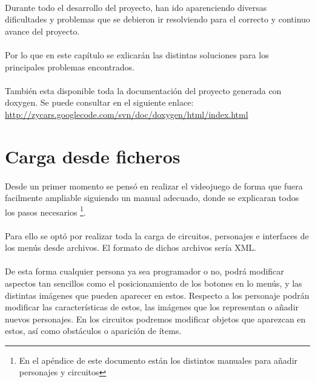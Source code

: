 \paragraph{}
Durante todo el desarrollo del proyecto, han ido aparenciendo diversas dificultades y problemas que se debieron ir
resolviendo para el correcto y continuo avance del proyecto.

\paragraph{}
Por lo que en este capítulo se exlicarán las distintas soluciones para los principales problemas encontrados. 

\paragraph{}
También esta disponible toda la documentación del proyecto generada con doxygen. Se puede consultar en el siguiente enlace:\\

\url{http://zycars.googlecode.com/svn/doc/doxygen/html/index.html}


\section{Carga desde ficheros}

\paragraph{}
Desde un primer momento se pensó en realizar el videojuego de forma que fuera facilmente ampliable siguiendo un manual adecuado, 
donde se explicaran todos los pasos necesarios \footnote{En el apéndice de este documento están los distintos manuales para
añadir personajes y circuitos}.

\paragraph{}
Para ello se optó por realizar toda la carga de circuitos, personajes e interfaces de los menús desde archivos. El formato de 
dichos archivos sería XML.

\paragraph{}
De esta forma cualquier persona ya sea programador o no, podrá modificar aspectos tan sencillos como el posicionamiento de los 
botones en lo menús, y las distintas imágenes que pueden aparecer en estos. Respecto a los personaje podrán modificar las 
características de estos, las imágenes que los representan o añadir nuevos personajes. En los circuitos podremos modificar objetos
que aparezcan en estos, así como obstáculos o aparición de ítems.

